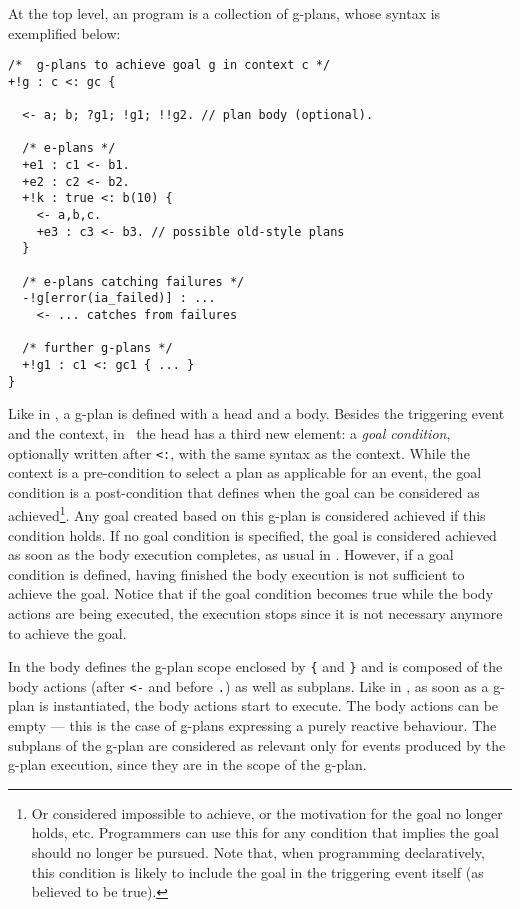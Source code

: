 At the top level, an {\aser} program is a collection of g-plans, whose
syntax is exemplified below:
%
%
{\small
\begin{verbatim}
/*  g-plans to achieve goal g in context c */
+!g : c <: gc { 

  <- a; b; ?g1; !g1; !!g2. // plan body (optional).

  /* e-plans */
  +e1 : c1 <- b1.	
  +e2 : c2 <- b2.
  +!k : true <: b(10) {
    <- a,b,c.
    +e3 : c3 <- b3. // possible old-style plans
  }	
  
  /* e-plans catching failures */
  -!g[error(ia_failed)] : ...
    <- ... catches from failures 

  /* further g-plans */
  +!g1 : c1 <: gc1 { ... }
}
\end{verbatim}}

Like in {\asl}, a g-plan is defined with a head and a body.
%
Besides the triggering event and the context, in \aser\ the head has a
third new element: a \emph{goal condition}, optionally written after
\texttt{<:}, with the same syntax as the context. While the context is
a pre-condition to select a plan as applicable for an event, the goal
condition is a post-condition that defines when the goal can be
considered as achieved\footnote{Or considered impossible to achieve,
  or the motivation for the goal no longer holds, etc. Programmers can
  use this for any condition that implies the goal should no longer be
  pursued. Note that, when programming declaratively, this condition
  is likely to include the goal in the triggering event itself (as
  believed to be true).}. Any goal created based on this g-plan is
considered achieved if %
this condition holds. If no goal condition is specified, the goal is
considered achieved as soon as the body execution completes, as usual
in \asl. However, if a goal condition is defined, having finished the
body execution is not sufficient to achieve the goal. Notice that if
the goal condition becomes true while the body actions are being
executed, the execution stops since it is not necessary anymore to achieve the goal. 

In {\aser} the body defines the g-plan scope enclosed by \texttt{\{} and \texttt{\}} and is
composed of the body actions (after \texttt{<-} and before \texttt{.})
as well as subplans. 
%
Like in {\asl}, as soon as a g-plan is instantiated, the body actions
start to execute. The body actions can be empty --- this is the case
of g-plans expressing a purely reactive behaviour.
%
The subplans of the g-plan are considered as relevant only for events
produced by the g-plan execution, since they are in the scope of the g-plan.

